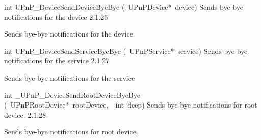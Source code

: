 \documentclass{article}
\begin{document}
\begin{cxxentry}
\begin{cxxentry}
\begin{cxxfunction}
\begin{cxxdoc}
\end{cxxdoc}
\end{cxxfunction}
\begin{cxxfunction}
{int}
        {UPnP\_DeviceSendDeviceByeBye}
        {(\ UPnPDevice*\ device)}
        {Sends bye-bye notifications for the device}
        {2.1.26}
\begin{cxxdoc}
Sends bye-bye notifications for the device


\end{cxxdoc}
\end{cxxfunction}
\begin{cxxfunction}
{int}
        {UPnP\_DeviceSendServiceByeBye}
        {(\ UPnPService*\ service)}
        {Sends bye-bye notifications for the service}
        {2.1.27}
\begin{cxxdoc}
Sends bye-bye notifications for the service


\end{cxxdoc}
\end{cxxfunction}
\begin{cxxfunction}
{int}
        {\_UPnP\_DeviceSendRootDeviceByeBye}
        {(\ UPnPRootDevice*\ rootDevice,\ \ int\ deep)}
        {Sends bye-bye notifications for root device.}
        {2.1.28}
\begin{cxxdoc}
Sends bye-bye notifications for root device.



\end{cxxdoc}
\end{cxxfunction}
\end{cxxentry}
\end{cxxentry}
\end{document}
